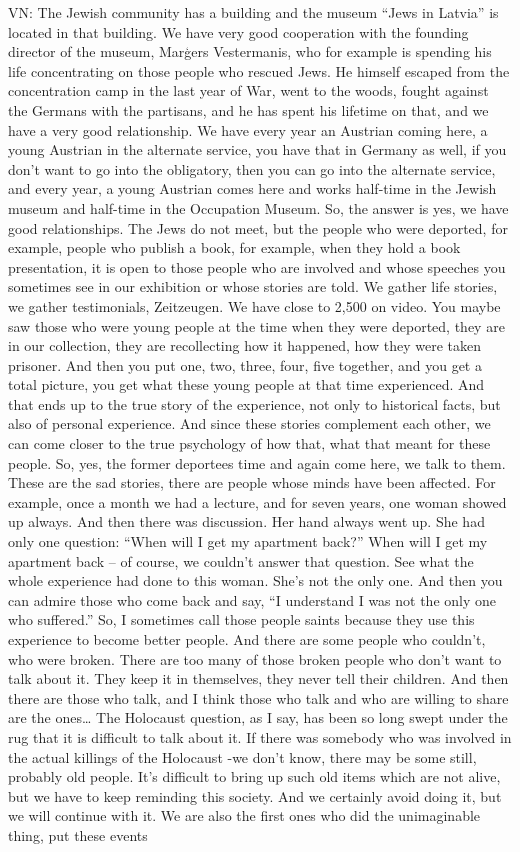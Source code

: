 VN: The Jewish community has a building and the museum “Jews in Latvia” is located in that building. We have very good cooperation with the founding director of the museum, Marģers Vestermanis, who for example is spending his life concentrating on those people who rescued Jews. He himself escaped from the concentration camp in the last year of War, went to the woods, fought against the Germans with the partisans, and he has spent his lifetime on that, and we have a very good relationship. We have every year an Austrian coming here, a young Austrian in the alternate service, you have that in Germany as well, if you don't want to go into the obligatory, then you can go into the alternate service, and every year, a young Austrian comes here and works half-time in the Jewish museum and half-time in the Occupation Museum. So, the answer is yes, we have good relationships. The Jews do not meet, but the people who were deported, for example, people who publish a book, for example, when they hold a book presentation, it is open to those people who are involved and whose speeches you sometimes see in our exhibition or whose stories are told. We gather life stories, we gather testimonials, Zeitzeugen. We have close to 2,500 on video. You maybe saw those who were young people at the time when they were deported, they are in our collection, they are recollecting how it happened, how they were taken prisoner. And then you put one, two, three, four, five together, and you get a total picture, you get what these young people at that time experienced. And that ends up to the true story of the experience, not only to historical facts, but also of personal experience. And since these stories complement each other, we can come closer to the true psychology of how that, what that meant for these people. So, yes, the former deportees time and again come here, we talk to them. These are the sad stories, there are people whose minds have been affected. For example, once a month we had a lecture, and for seven years, one woman showed up always. And then there was discussion. Her hand always went up. She had only one question: “When will I get my apartment back?” When will I get my apartment back – of course, we couldn’t answer that question. See what the whole experience had done to this woman. She’s not the only one. And then you can admire those who come back and say, “I understand I was not the only one who suffered.” So, I sometimes call those people saints because they use this experience to become better people. And there are some people who couldn’t, who were broken. There are too many of those broken people who don’t want to talk about it. They keep it in themselves, they never tell their children. And then there are those who talk, and I think those who talk and who are willing to share are the ones… The Holocaust question, as I say, has been so long swept under the rug that it is difficult to talk about it. If there was somebody who was involved in the actual killings of the Holocaust -we don’t know, there may be some still, probably old people. It’s difficult to bring up such old items which are not alive, but we have to keep reminding this society. And we certainly avoid doing it, but we will continue with it. We are also the first ones who did the unimaginable thing, put these events 